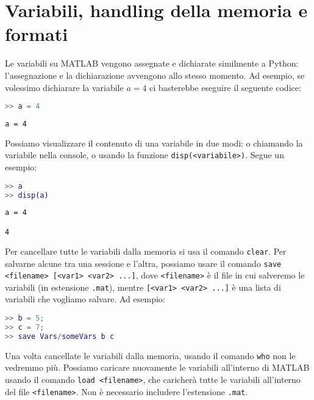 \section{Variabili, handling della memoria e formati}

Le variabili su MATLAB vengono assegnate e dichiarate similmente a Python: l'assegnazione e la dichiarazione avvengono allo stesso momento. Ad esempio, se volessimo dichiarare la variabile $a=4$ ci basterebbe eseguire il seguente codice:

\begin{terminal}
    \begin{lstlisting}[language=MATLAB, style=notexterm]
>> a = 4\end{lstlisting}
    \tcblower
    \begin{lstlisting}[style=notexterm, language = tex]
a = 4\end{lstlisting}
\end{terminal}

Possiamo visualizzare il contenuto di una variabile in due modi: o chiamando la variabile nella console, o usando la funzione \texttt{disp(<variabile>)}. Segue un esempio:

\begin{terminal}
    \begin{lstlisting}[language=MATLAB, style=notexterm]
>> a
>> disp(a)\end{lstlisting}
    \tcblower
    \begin{lstlisting}[style=notexterm, language = tex]
a = 4

4\end{lstlisting}
\end{terminal}

Per cancellare tutte le variabili dalla memoria si usa il comando \texttt{clear}. Per salvarne alcune tra una sessione e l'altra, possiamo usare il comando \texttt{save <filename> [<var1> <var2> ...]}, dove \texttt{<filename>} è il file in cui salveremo le variabili (in estensione \texttt{.mat}), mentre \texttt{[<var1> <var2> ...]} è una lista di variabili che vogliamo salvare. Ad esempio:

\begin{terminal}
    \begin{lstlisting}[language=MATLAB, style=notexterm]
>> b = 5;
>> c = 7;
>> save Vars/someVars b c\end{lstlisting}
\end{terminal}

Una volta cancellate le variabili dalla memoria, usando il comando \texttt{who} non le vedremmo più. Possiamo caricare nuovamente le variabili all'interno di MATLAB usando il comando \texttt{load <filename>}, che caricherà tutte le variabili all'interno del file \texttt{<filename>}. Non è necessario includere l'estensione \texttt{.mat}.

